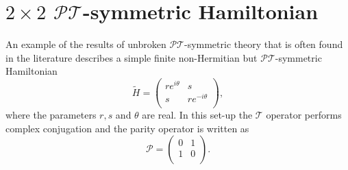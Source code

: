 \documentclass[12pt, a4paper]{report}
\newcommand\PT{\(\mathcal{PT}\)}
\newcommand\TT{\(\mathcal{T}\)}
\begin{document}
\section{$2\times2$ \PT-symmetric Hamiltonian}\label{2x2}
An example of the results of unbroken \PT-symmetric theory that is often found in the literature describes a simple finite non-Hermitian but \PT-symmetric Hamiltonian
\begin{equation}\label{eq:2.11}
\tilde{H} = \begin{pmatrix}
re^{i\theta} & s  \\
s & re^{-i\theta} \\
\end{pmatrix},
\end{equation}
where the parameters $r, s$ and $\theta$ are real. In this set-up the \TT\: operator performs complex conjugation and the parity operator is written as
\begin{equation}\label{eq:2.12}
\mathcal{P} = \begin{pmatrix}
0 & 1  \\
1 & 0 \\
\end{pmatrix}.
\end{equation}
\end{document}
